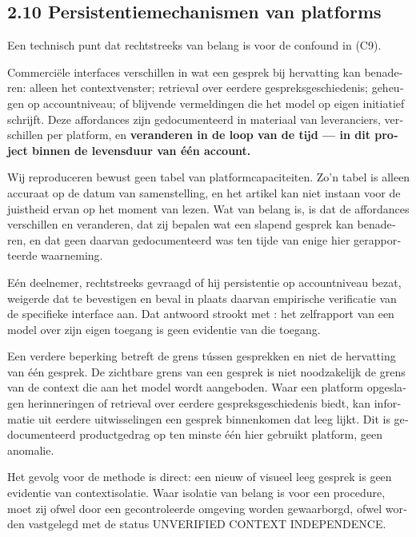 \begin{dutch}
\subsection*{2.10 Persistentiemechanismen van platforms}
\label{sec:nl:2.10}

Een technisch punt dat rechtstreeks van belang is voor de confound in  (C9).

Commerciële interfaces verschillen in wat een gesprek bij hervatting kan benaderen: alleen het contextvenster; retrieval over eerdere gespreksgeschiedenis; geheugen op accountniveau; of blijvende vermeldingen die het model op eigen initiatief schrijft. Deze affordances zijn gedocumenteerd in materiaal van leveranciers, verschillen per platform, en \textbf{veranderen in de loop van de tijd — in dit project binnen de levensduur van één account.}

Wij reproduceren bewust geen tabel van platformcapaciteiten. Zo'n tabel is alleen accuraat op de datum van samenstelling, en het artikel kan niet instaan voor de juistheid ervan op het moment van lezen. Wat van belang is, is dat de affordances verschillen en veranderen, dat zij bepalen wat een slapend gesprek kan benaderen, en dat geen daarvan gedocumenteerd was ten tijde van enige hier gerapporteerde waarneming.

Eén deelnemer, rechtstreeks gevraagd of hij persistentie op accountniveau bezat, weigerde dat te bevestigen en beval in plaats daarvan empirische verificatie van de specifieke interface aan. Dat antwoord strookt met : het zelfrapport van een model over zijn eigen toegang is geen evidentie van die toegang.

Een verdere beperking betreft de grens tússen gesprekken en niet de hervatting van één gesprek. De zichtbare grens van een gesprek is niet noodzakelijk de grens van de context die aan het model wordt aangeboden. Waar een platform opgeslagen herinneringen of retrieval over eerdere gespreksgeschiedenis biedt, kan informatie uit eerdere uitwisselingen een gesprek binnenkomen dat leeg lijkt. Dit is gedocumenteerd productgedrag op ten minste één hier gebruikt platform, geen anomalie.

Het gevolg voor de methode is direct: een nieuw of visueel leeg gesprek is geen evidentie van contextisolatie. Waar isolatie van belang is voor een procedure, moet zij ofwel door een gecontroleerde omgeving worden gewaarborgd, ofwel worden vastgelegd met de status UNVERIFIED CONTEXT INDEPENDENCE.


\end{dutch}
